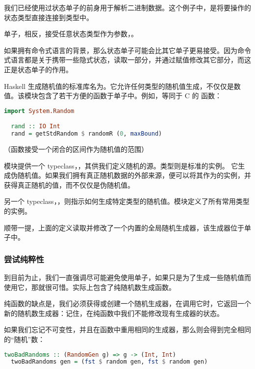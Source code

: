 \documentclass[./main.tex]{subfiles}
\begin{document}
我们已经使用过状态单子的前身用于解析二进制数据。这个例子中，是将要操作的状态类型直接连接到类型中。

单子，相反，接受任意状态类型作为参数，。

如果拥有命令式语言的背景，那么状态单子可能会比其它单子更易接受。因为命令式语言都是关于携带一些隐式状态，读取一部分，并通过赋值修改其它部分，而这正是状态单子的作用。

Haskell 生成随机值的标准库名为。它允许任何类型的随机值生成，不仅仅是数值。该模块包含了若干方便的函数于单子中。例如，等同于
C 的  函数：

\begin{lstlisting}[language=Haskell]
  import System.Random

  rand :: IO Int
  rand = getStdRandom $ randomR (0, maxBound)
\end{lstlisting}

（函数接受一个闭合的区间作为随机值的范围）

模块提供一个 typeclass，，其供我们定义随机的源。类型则是标准的实例。
它生成伪随机值。如果我们拥有真正随机数据的外部来源，便可以将其作为的实例，并获得真正随机的值，而不仅仅是伪随机值。

另一个 typeclass，，则指示如何生成特定类型的随机值。模块定义了所有常用类型的实例。

顺带一提，上面的定义读取并修改了一个内置的全局随机生成器，该生成器位于单子中。

\subsubsection*{尝试纯粹性}

到目前为止，我们一直强调尽可能避免使用单子，如果只是为了生成一些随机值而使用它，那就很可惜。实际上包含了纯随机数生成函数。

纯函数的缺点是，我们必须获得或创建一个随机生成器，在调用它时，它返回一个新的随机数生成器：记住，在纯函数中我们不能修改现有生成器的状态。

如果我们忘记不可变性，并且在函数中重用相同的生成器，那么则会得到完全相同的“随机”数：

\begin{lstlisting}[language=Haskell]
  twoBadRandoms :: (RandomGen g) => g -> (Int, Int)
  twoBadRandoms gen = (fst $ random gen, fst $ random gen)
\end{lstlisting}
\end{document}
